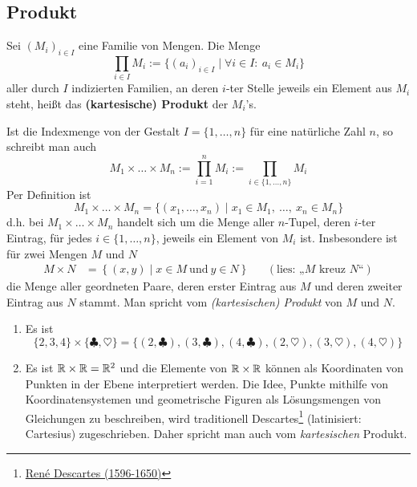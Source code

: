 \subsection*{Produkt}


\begin{de}  
    Sei $(M_i)_{i\in I}$ eine Familie von Mengen. Die Menge
        \[ \prod_{i\in I} M_i := \{ (a_i)_{i\in I} \mid \forall i\in I:\ a_i\in M_i \} \]
    aller durch $I$ indizierten Familien, an deren $i$-ter Stelle jeweils ein Element aus $M_i$ steht, heißt das \textbf{(kartesische) Produkt} der $M_i$'s.

    Ist die Indexmenge von der Gestalt $I=\{1,\dots , n\}$ für eine natürliche Zahl $n$, so schreibt man auch
        \[ M_1\times\ldots\times M_n := \prod_{i=1}^n M_i := \prod_{i\in \{1,\dots , n\}} M_i   \]
    Per Definition ist
        \[ M_1\times\ldots\times M_n = \{ (x_1,\dots , x_n) \mid x_1\in M_1,\ \ldots,\ x_n\in M_n \} \]
    d.h. bei $M_1\times\ldots\times M_n$ handelt sich um die Menge aller $n$-Tupel, deren $i$-ter Eintrag, für jedes $i\in \{1,\dots , n\}$, jeweils ein Element von $M_i$ ist.
    Insbesondere ist für zwei Mengen $M$ und $N$
    \begin{align*}
        M \times N & = \left\{ (x,y) \mid x\in M\ \text{und}\ y\in N \right\}  && (\text{lies: „$M$ kreuz $N$“})
    \end{align*}
    die Menge aller geordneten Paare, deren erster Eintrag aus $M$ und deren zweiter Eintrag aus $N$ stammt. Man spricht vom \emph{(kartesischen) Produkt} von $M$ und $N$.
\end{de}


\begin{bsp} \quad
    \begin{enumerate}
        \item Es ist
            \[ \{2,3,4\}\times \{ \clubsuit,\heartsuit\} = \{ (2,\clubsuit), (3,\clubsuit), (4,\clubsuit), (2,\heartsuit), (3,\heartsuit), (4,\heartsuit) \}\]
        \item Es ist $\mathbb R\times \mathbb R=\mathbb R^2$ und die Elemente von $\mathbb R\times \mathbb R$ können als Koordinaten von Punkten in der Ebene interpretiert werden. Die Idee, Punkte mithilfe von Koordinatensystemen und geometrische Figuren als Lösungsmengen von Gleichungen zu beschreiben, wird traditionell Descartes\footnote{\href{https://de.wikipedia.org/wiki/Rene_Descartes}{René Descartes (1596-1650)}} (latinisiert: Cartesius) zugeschrieben. Daher spricht man auch vom \emph{kartesischen} Produkt.
    \end{enumerate}
\end{bsp}


